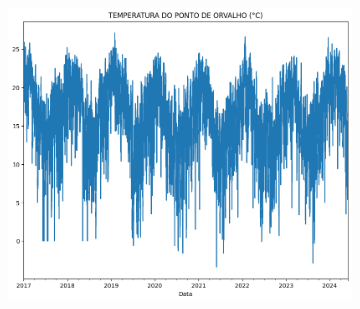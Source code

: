 \begin{itemize}
\begin{figure}[H]
\begin{center}
\begin{subfigure}{0.35\textwidth}
			\includegraphics[width=\linewidth]{figuras/comparacao_temp_2.png}
		\end{subfigure}
		

\end{center}
\end{figure}
\end{itemize}
